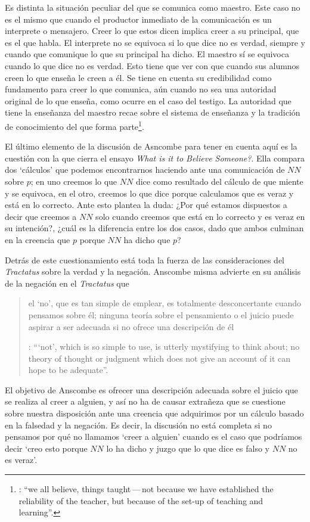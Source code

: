 Es distinta la situación peculiar del que se comunica como maestro. Este caso no es el mismo que cuando el productor inmediato de la comunicación es un interprete o mensajero. Creer lo que estos dicen implica creer a su principal, que es el que habla. El interprete no se equivoca si lo que dice no es verdad, siempre y cuando que comunique lo que su principal ha dicho. El maestro sí se equivoca cuando lo que dice no es verdad. Esto tiene que ver con que cuando sus alumnos creen lo que enseña le creen a él. Se tiene en cuenta su credibilidad como fundamento para creer lo que comunica, aún cuando no sea una autoridad original de lo que enseña, como ocurre en el caso del testigo. La autoridad que tiene la enseñanza del maestro recae sobre el sistema de enseñanza y la tradición de conocimiento del que forma parte\footnote{\cite[Cf.][214]{teichmann2008ans}: \enquote{we all believe, things taught\,---\,not because we have established the reliability of the teacher, but because of the set-up of teaching and learning}.}.

El último elemento de la discusión de Asncombe para tener en cuenta aquí es la cuestión con la que cierra el ensayo \emph{What is it to Believe Someone?}. Ella compara dos `cálculos' que podemos encontrarnos haciendo ante una comunicación de $NN$ sobre $p$; en uno creemos lo que $NN$ dice como resultado del cálculo de que miente y se equivoca, en el otro, creemos lo que dice porque calculamos que es veraz y está en lo correcto. Ante esto plantea la duda: ¿Por qué estamos dispuestos a decir que creemos a $NN$ solo cuando creemos que está en lo correcto y es veraz en su intención?, ¿cuál es la diferencia entre los dos casos, dado que ambos culminan en la creencia que $p$ porque $NN$ ha dicho que $p$?
\label{subsec:verdad}

Detrás de este cuestionamiento está toda la fuerza de las consideraciones del \emph{Tractatus} sobre la verdad y la negación. Anscombe misma advierte en su análisis de la negación en el \emph{Tractatus} que \blockquote[{\Cite[19]{anscombe1959iwt}}: \enquote{`not', which is so simple to use, is utterly mystifying to think about; no theory of thought or judgment which does not give an account of it can hope to be adequate}.]{el `no', que es tan simple de emplear, es totalmente desconcertante cuando pensamos sobre él; ninguna teoría sobre el pensamiento o el juicio puede aspirar a ser adecuada si no ofrece una descripción de él}. El objetivo de Anscombe es ofrecer una descripción adecuada sobre el juicio que se realiza al creer a alguien, y así no ha de causar extrañeza que se cuestione sobre nuestra disposición ante una creencia que adquirimos por un cálculo basado en la falsedad y la negación. Es decir, la discusión no está completa si no pensamos por qué no llamamos `creer a alguien' cuando es el caso que podríamos decir \enquote*{creo esto porque $NN$ lo ha dicho y juzgo que lo que dice es falso y $NN$ no es veraz}.

